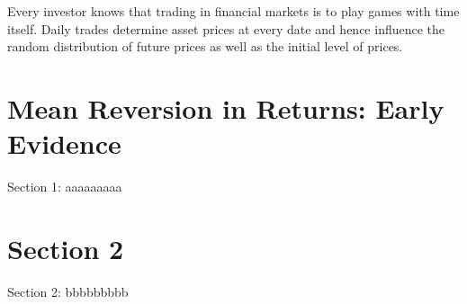 \minitoc

\vspace{0.5cm}
Every investor knows that trading in financial markets is to play
games with time itself. Daily trades determine asset prices at every date and hence
influence the random distribution of future prices as well as the initial
level of prices. 

\section{Mean Reversion in Returns: Early Evidence}
Section 1: aaaaaaaaa

\section{Section 2}
Section 2: bbbbbbbbb